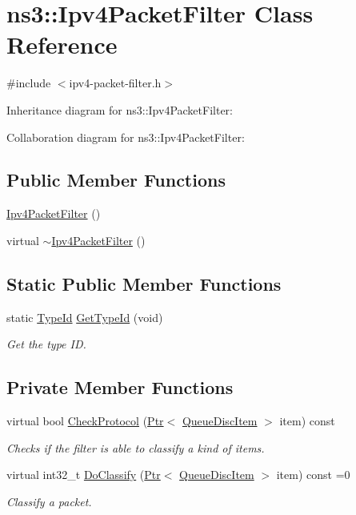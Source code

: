\hypertarget{classns3_1_1Ipv4PacketFilter}{}\section{ns3\+:\+:Ipv4\+Packet\+Filter Class Reference}
\label{classns3_1_1Ipv4PacketFilter}


{\ttfamily \#include $<$ipv4-\/packet-\/filter.\+h$>$}



Inheritance diagram for ns3\+:\+:Ipv4\+Packet\+Filter\+:


Collaboration diagram for ns3\+:\+:Ipv4\+Packet\+Filter\+:
\subsection*{Public Member Functions}
\begin{DoxyCompactItemize}
\item 
\hyperlink{classns3_1_1Ipv4PacketFilter_ac6976be81e13087af0e26c95b991fe53}{Ipv4\+Packet\+Filter} ()
\item 
virtual \hyperlink{classns3_1_1Ipv4PacketFilter_aa628f16d25a75f4bc0299085083bf42d}{$\sim$\+Ipv4\+Packet\+Filter} ()
\end{DoxyCompactItemize}
\subsection*{Static Public Member Functions}
\begin{DoxyCompactItemize}
\item 
static \hyperlink{classns3_1_1TypeId}{Type\+Id} \hyperlink{classns3_1_1Ipv4PacketFilter_aaf50a19eb2f3e7491528b70bf5fc5ec6}{Get\+Type\+Id} (void)
\begin{DoxyCompactList}\small\item\em Get the type ID. \end{DoxyCompactList}\end{DoxyCompactItemize}
\subsection*{Private Member Functions}
\begin{DoxyCompactItemize}
\item 
virtual bool \hyperlink{classns3_1_1Ipv4PacketFilter_a194726a929d56b683a070a2caa9e1a84}{Check\+Protocol} (\hyperlink{classns3_1_1Ptr}{Ptr}$<$ \hyperlink{classns3_1_1QueueDiscItem}{Queue\+Disc\+Item} $>$ item) const 
\begin{DoxyCompactList}\small\item\em Checks if the filter is able to classify a kind of items. \end{DoxyCompactList}\item 
virtual int32\+\_\+t \hyperlink{classns3_1_1Ipv4PacketFilter_a6761e159f66f21fa508ebda57103f2dd}{Do\+Classify} (\hyperlink{classns3_1_1Ptr}{Ptr}$<$ \hyperlink{classns3_1_1QueueDiscItem}{Queue\+Disc\+Item} $>$ item) const =0
\begin{DoxyCompactList}\small\item\em Classify a packet. \end{DoxyCompactList}\end{DoxyCompactItemize}
